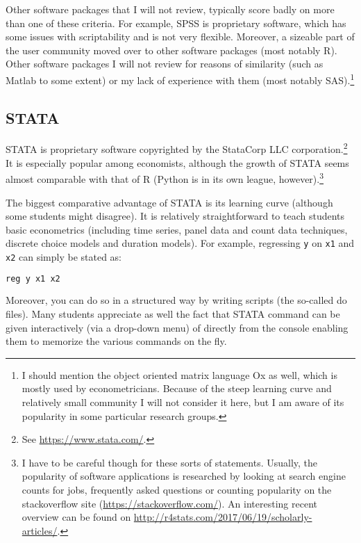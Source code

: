 \documentclass[fleqn,10pt]{SelfArx} %
\begin{document}
Other software packages that I will not review, typically score badly on more than one of these criteria. For example, SPSS is proprietary software, which has some issues with scriptability and is not very flexible. Moreover, a sizeable part of the user community moved over to other software packages (most notably R). Other software packages I will not review for reasons of similarity (such as Matlab to some extent) or my lack of experience with them (most notably SAS).\footnote{I should mention the object oriented matrix language Ox as well, which is mostly used by econometricians. Because of the steep learning curve and relatively small community I will not consider it here, but I am aware of its popularity in some particular research groups.}

\subsection*{STATA}

STATA is proprietary software copyrighted by the StataCorp LLC corporation.\footnote{See \href{https://www.stata.com}{https://www.stata.com/}.} It is especially popular among economists, although the growth of STATA seems almost comparable with that of R (Python is in its own league, however).\footnote{I have to be careful though for these sorts of statements. Usually, the popularity of software applications is researched by looking at search engine counts for jobs, frequently asked questions or counting popularity on the stackoverflow site (\href{https://stackoverflow.com/}{https://stackoverflow.com/}). An interesting recent overview can be found on \href{http://r4stats.com/2017/06/19/scholarly-articles/}{http://r4stats.com/2017/06/19/scholarly-articles/}.}

The biggest comparative advantage of STATA is its learning curve (although some students might disagree). It is relatively straightforward to teach students basic econometrics (including time series, panel data and count data techniques, discrete choice models and duration models). For example, regressing \texttt{y} on \texttt{x1} and \texttt{x2} can simply be stated as:
\begin{lstlisting}[language=R]
reg y x1 x2
\end{lstlisting}
Moreover, you can do so in a structured way by writing scripts (the so-called do files). Many students appreciate as well the fact that STATA command can be given interactively (via a drop-down menu) of directly from the console enabling them to memorize the various commands on the fly. 
\end{document}
